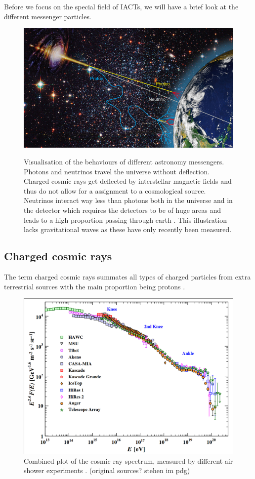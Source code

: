 Before we focus on the special field of IACTs, we will have
a brief look at the different messenger particles.

\begin{figure}
	\centering
	\includegraphics[width=.8\textwidth]{images/astro-web-titel.jpg}
	\label{fig:multi_messenger}
	\caption{Visualisation of the behaviours of different astronomy messengers.
		Photons and neutrinos 
		travel the universe without deflection.
		Charged cosmic rays get deflected by interstellar
		magnetic fields and thus do not allow for a assignment to a cosmological source.
		Neutrinos interact way less than photons both in the universe and in the detector 
		which requires the detectors to be of huge areas and leads to a high 
		proportion passing through earth
		\cite{desy_mm_astro}.
		This illustration lacks gravitational waves 
		as these have only recently been measured.
	}
\end{figure}


\subsection{Charged cosmic rays}
The term charged cosmic rays summates all types of charged particles from
extra terrestrial sources with the main proportion being protons
\cite{Dembinski:2017zsh}.


\begin{figure}
	\centering
	\includegraphics[width=.8\textwidth]{images/cr_spectrum.png}
	\caption{Combined plot of the cosmic ray spectrum,
		measured by different air shower experiments \cite{pdg19}. 
		(original sources? stehen im pdg)
	}
	\label{fig:cr_spectrum}
\end{figure}

